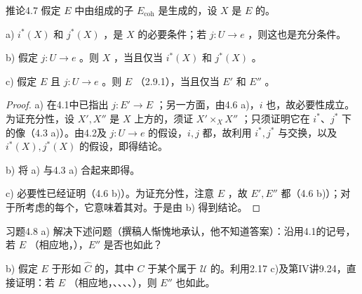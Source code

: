 \begin{SGAresult}{推论}{4.7}
假定 $E$ 中由组成的子 $E_{\mathrm{coh}}$ 是生成的，设 $X$ 是 $E$ 的。

a) $i^*(X)$ 和 $j^*(X)$ ，是 $X$ 的必要条件；若 $j:U\to e$ ，则这也是充分条件。

b) 假定 $j:U\to e$ 。则 $X$ ，当且仅当 $i^*(X)$ 和 $j^*(X)$ 。

c) 假定 $E$ 且 $j:U\to e$ 。则 $E$ （2.9.1），当且仅当 $E'$ 和 $E''$ 。
\end{SGAresult}
\begin{proof}
a) 在4.1中已指出 $j:E'\to E$ ；另一方面，由4.6 a)，$i$ 也，故必要性成立。为证充分性，设 $X',X''$ 是 $X$ 上方的，须证 $X'\times_X X''$ ；只须证明它在 $i^*$、$j^*$ 下的像（4.3 a)）。由4.2及 $j:U\to e$ 的假设，$i,j$ 都，故利用 $i^*,j^*$ 与交换，以及 $i^*(X),j^*(X)$ 的假设，即得结论。

b) 将 a) 与4.3 a) 合起来即得。

c) 必要性已经证明（4.6 b)）。为证充分性，注意 $E$ ，故 $E',E''$ 都（4.6 b)）；对于所考虑的每个，它意味着其对。于是由 b) 得到结论。
\end{proof}

\begin{SGAresult}{习题}{4.8}
a) 解决下述问题（撰稿人惭愧地承认，他不知道答案）：沿用4.1的记号，若 $E$ （相应地，），$E''$ 是否也如此？

b) 假定 $E$ 于形如 $\widehat C$ 的，其中 $C$ 于某个属于 $\mathcal U$ 的。利用2.17 c)及第IV讲9.24，直接证明：若 $E$ （相应地，、、、、），则 $E''$ 也如此。
\end{SGAresult}

